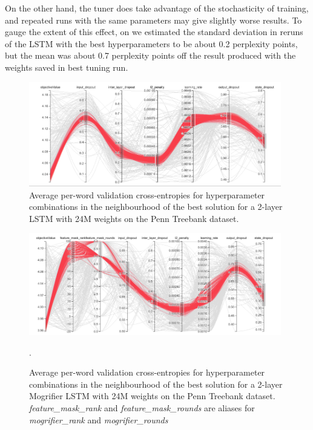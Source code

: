 \begin{subappendices}
On the other hand, the tuner does take advantage of the stochasticity
of training, and repeated runs with the same parameters may give
slightly worse results.
%
To gauge the extent of this effect, on \ptb we estimated the standard
deviation in reruns of the LSTM with the best hyperparameters to be
about 0.2 perplexity points, but the mean was about 0.7 perplexity
points off the result produced with the weights saved in best tuning
run.

\begin{figure}[tp]\centering
  \includegraphics[width=0.98\textwidth,trim={0cm 0.1cm 0.0cm 0cm},clip]
                  {mogrifier/figure/ptb-24m-lstm-d2-sensitivity.png}
  \caption[LSTM hyperparameter sensitivity on PTB.]{Average
    per-word validation cross-entropies for hyperparameter
    combinations in the neighbourhood of the best solution for a
    2-layer LSTM with 24M weights on the Penn Treebank dataset.}
  \label{fig:lstm-sensitivity}
\end{figure}

\begin{figure}[tp]\centering
  \includegraphics[width=0.98\textwidth,trim={0cm 0.1cm 0.0cm 0cm},clip]
                  {mogrifier/figure/ptb-24m-fm-d2-sensitivity.png}
  \caption[Mogrifier hyperparameter sensitivity on PTB.]{Average
    per-word validation cross-entropies for hyperparameter
    combinations in the neighbourhood of the best solution for a
    2-layer Mogrifier LSTM with 24M weights on the Penn Treebank
    dataset. \emph{feature\_mask\_rank} and
    \emph{feature\_mask\_rounds} are aliases for
    \emph{mogrifier\_rank} and \emph{mogrifier\_rounds}}.
  \label{fig:fm-sensitivity}
\end{figure}

\end{subappendices}
